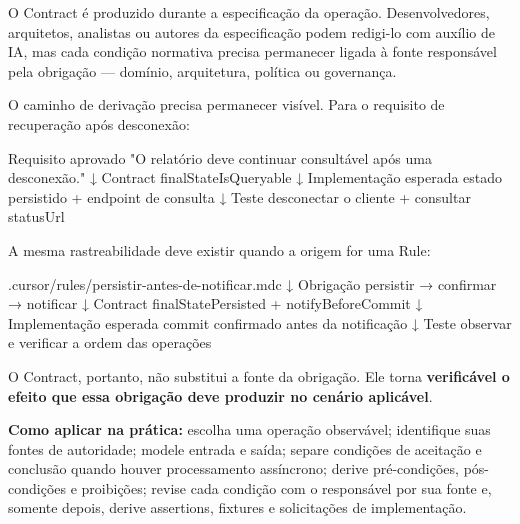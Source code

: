 \documentclass[
  10pt,
  a4paper,
  oneside]{book}
\newenvironment{Shaded}{}{}
\newcommand{\NormalTok}[1]{#1}
\renewenvironment{Shaded}{\begin{snugshade}}{\end{snugshade}}%
\begin{document}
O Contract é produzido durante a especificação da operação.
Desenvolvedores, arquitetos, analistas ou autores da especificação podem
redigi-lo com auxílio de IA, mas cada condição normativa precisa
permanecer ligada à fonte responsável pela obrigação --- domínio,
arquitetura, política ou governança.

O caminho de derivação precisa permanecer visível. Para o requisito de
recuperação após desconexão:

\begin{Shaded}
\begin{Highlighting}[]
\NormalTok{Requisito aprovado}
\NormalTok{"O relatório deve continuar consultável após uma desconexão."}
\NormalTok{        ↓}
\NormalTok{Contract}
\NormalTok{finalStateIsQueryable}
\NormalTok{        ↓}
\NormalTok{Implementação esperada}
\NormalTok{estado persistido + endpoint de consulta}
\NormalTok{        ↓}
\NormalTok{Teste}
\NormalTok{desconectar o cliente + consultar statusUrl}
\end{Highlighting}
\end{Shaded}

A mesma rastreabilidade deve existir quando a origem for uma Rule:

\begin{Shaded}
\begin{Highlighting}[]
\NormalTok{.cursor/rules/persistir{-}antes{-}de{-}notificar.mdc}
\NormalTok{        ↓}
\NormalTok{Obrigação}
\NormalTok{persistir → confirmar → notificar}
\NormalTok{        ↓}
\NormalTok{Contract}
\NormalTok{finalStatePersisted + notifyBeforeCommit}
\NormalTok{        ↓}
\NormalTok{Implementação esperada}
\NormalTok{commit confirmado antes da notificação}
\NormalTok{        ↓}
\NormalTok{Teste}
\NormalTok{observar e verificar a ordem das operações}
\end{Highlighting}
\end{Shaded}

O Contract, portanto, não substitui a fonte da obrigação. Ele torna
\textbf{verificável o efeito que essa obrigação deve produzir no cenário
aplicável}.

\textbf{Como aplicar na prática:} escolha uma operação observável;
identifique suas fontes de autoridade; modele entrada e saída; separe
condições de aceitação e conclusão quando houver processamento
assíncrono; derive pré-condições, pós-condições e proibições; revise
cada condição com o responsável por sua fonte e, somente depois, derive
assertions, fixtures e solicitações de implementação.
\end{document}
